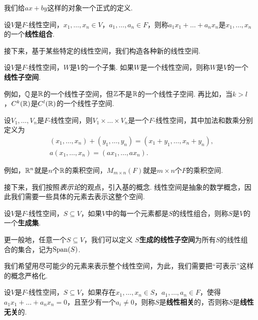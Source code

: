 我们给$ax+by$这样的对象一个正式的定义. 

\begin{definition}[线性组合]
设$V$是$F$-线性空间，$x_1,\dots,x_n\in V$，$a_1,\dots,a_n\in F$，则称$a_1x_1+\dots+a_nx_n$是$x_1,\dots,x_n$的一个\textbf{线性组合}. 
\end{definition}

接下来，基于某些特定的线性空间，我们构造各种新的线性空间. 

\begin{definition}[线性子空间]
设$V$是$F$-线性空间，$W$是$V$的一个子集. 如果$W$是一个线性空间，则称$W$是$V$的一个\textbf{线性子空间}. 
\end{definition}

例如，$\mathbb{Q}$是$\mathbb{R}$的一个线性子空间，但$\mathbb{Z}$不是$\mathbb{R}$的一个线性子空间. 再比如，当$k>l$，$C^k(\mathbb{R})$是$C^l(\mathbb{R})$的一个线性子空间. 

\begin{definition}[乘积空间]
设$V_1,\dots,V_n$是$F$-线性空间，则$V_1\times\dots\times V_n$是一个$F$-线性空间，其中加法和数乘分别定义为
\begin{align*}
    &(x_1,\dots,x_n)+(y_1,\dots,y_n)=(x_1+y_1,\dots,x_n+y_n),\\
    &a(x_1,\dots,x_n)=(ax_1,\dots,ax_n).
\end{align*}
\end{definition}

例如，$\mathbb{R}^n$就是$n$个$\mathbb{R}$的乘积空间，$M_{m\times n}(F)$就是$m\times n$个$F$的乘积空间. 

接下来，我们按照\textit{表示论}的观点，引入基的概念. 线性空间是抽象的数学概念，因此我们需要一些具体的元素去表示这整个空间. 

\begin{definition}[生成集]
设$V$是$F$-线性空间，$S\subseteq V$，如果$V$中的每一个元素都是$S$的线性组合，则称$S$是$V$的一个\textbf{生成集}. 

更一般地，任意一个$S\subseteq V$，我们可以定义 \textbf{$S$生成的线性子空间}为所有$S$的线性组合的集合，记为$\operatorname*{Span}(S)$. 
\end{definition}

我们希望用尽可能少的元素来表示整个线性空间，为此，我们需要把“可表示”这样的概念严格化. 

\begin{definition}[线性相关]
设$V$是$F$-线性空间，$S\subseteq V$，如果存在$x_1,\dots,x_n\in S$，$a_1,\dots,a_n\in F$，使得$a_1x_1+\dots+a_nx_n=0$，且至少有一个$a_i\neq 0$，则称$S$是\textbf{线性相关}的，否则称$S$是\textbf{线性无关}的. 
\end{definition}

